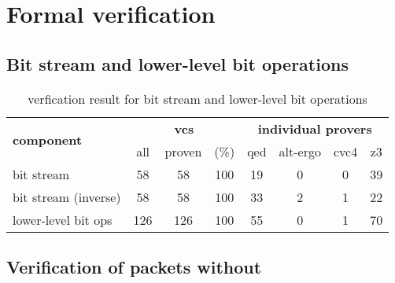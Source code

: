 
\chapter{Formal verification}
\label{cha:formal-verification}

\section{Bit stream and lower-level bit operations}
\label{sec:bitstream-verification}

\begin{table}[hbt]
\begin{center}
    \begin{tabular}{|l|ccc|cccc|}
\hline
\multirow{2}{*}{\textbf{component}} &
\multicolumn{3}{c|}{ \textbf{vcs}} &
\multicolumn{4}{c|}{\textbf{individual provers}}\\
\cline{2-8}
               &  all & proven & (\%) & qed & alt-ergo & cvc4 & z3  \\
\hline
\hline
bit stream     & 58 &  58 & 100 & 19 &  0 & 0 & 39  \\
\hline
bit stream (inverse)  & 58 & 58 & 100 & 33 &  2 & 1 & 22  \\
\hline
lower-level bit ops & 126 & 126 & 100 & 55 &  0 & 1 & 70  \\
\hline
\end{tabular}
\end{center}
\caption{\label{tbl:bitstream-verification} verfication result for bit stream and lower-level bit operations}
\end{table}

\FloatBarrier  %

\section{Verification of packets without }
\label{sec:packets-without-niter-verification}


